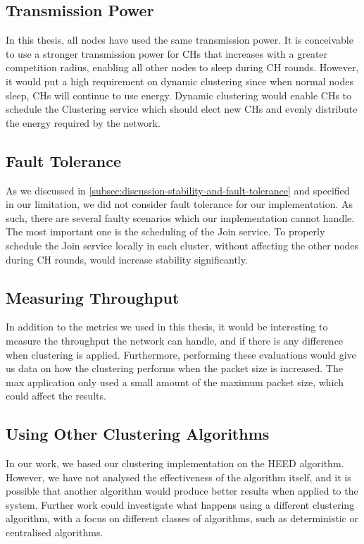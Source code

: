 \subsection{Transmission Power}
In this thesis, all nodes have used the same transmission power. It is conceivable to use a stronger transmission power for CHs that increases with a greater competition radius, enabling all other nodes to sleep during CH rounds. However, it would put a high requirement on dynamic clustering since when normal nodes sleep, CHs will continue to use energy. Dynamic clustering would enable CHs to schedule the Clustering service which should elect new CHs and evenly distribute the energy required by the network.

\subsection{Fault Tolerance}
\begin{newtext}
As we discussed in \cref{subsec:discussion-stability-and-fault-tolerance} and specified in our limitation, we did not consider fault tolerance for our implementation. As such, there are several faulty scenarios which our implementation cannot handle. The most important one is the scheduling of the Join service. To properly schedule the Join service locally in each cluster, without affecting the other nodes during CH rounds, would increase stability significantly.
\end{newtext}

\subsection{Measuring Throughput}
\begin{newtext}
In addition to the metrics we used in this thesis, it would be interesting to measure the throughput the network can handle, and if there is any difference when clustering is applied. Furthermore, performing these evaluations would give us data on how the clustering performs when the packet size is increased. The max application only used a small amount of the maximum packet size, which could affect the results.
\end{newtext}

\subsection{Using Other Clustering Algorithms}
In our work, we based our clustering implementation on the HEED algorithm.  However, we have not analysed the effectiveness of the algorithm itself, and it is possible that another algorithm would produce better results when applied to the \atwo{} system. Further work could investigate what happens using a different clustering algorithm, with a focus on different classes of algorithms, such as deterministic or centralised algorithms.